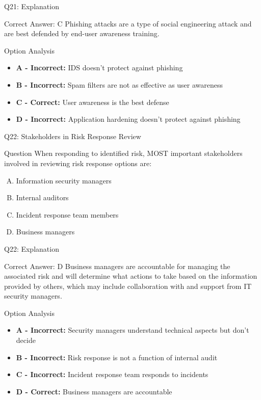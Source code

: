 \documentclass{beamer}
\begin{document}
	\begin{frame}{Q21: Explanation}
		\begin{block}{Correct Answer: C}
			Phishing attacks are a type of social engineering attack and are best defended by end-user awareness training.
		\end{block}
		\begin{block}{Option Analysis}
			\begin{itemize}
				\item \textbf{A - Incorrect:} IDS doesn't protect against phishing
				\item \textbf{B - Incorrect:} Spam filters are not as effective as user awareness
				\item \textbf{C - Correct:} User awareness is the best defense
				\item \textbf{D - Incorrect:} Application hardening doesn't protect against phishing
			\end{itemize}
		\end{block}
	\end{frame}
	
	\begin{frame}{Q22: Stakeholders in Risk Response Review}
		\begin{block}{Question}
			When responding to identified risk, MOST important stakeholders involved in reviewing risk response options are:
		\end{block}
		\begin{enumerate}[(A)]
			\item Information security managers
			\item Internal auditors
			\item Incident response team members
			\item Business managers
		\end{enumerate}
	\end{frame}
	
	\begin{frame}{Q22: Explanation}
		\begin{block}{Correct Answer: D}
			Business managers are accountable for managing the associated risk and will determine what actions to take based on the information provided by others, which may include collaboration with and support from IT security managers.
		\end{block}
		\begin{block}{Option Analysis}
			\begin{itemize}
				\item \textbf{A - Incorrect:} Security managers understand technical aspects but don't decide
				\item \textbf{B - Incorrect:} Risk response is not a function of internal audit
				\item \textbf{C - Incorrect:} Incident response team responds to incidents
				\item \textbf{D - Correct:} Business managers are accountable
			\end{itemize}
		\end{block}
	\end{frame}
	
\end{document}
